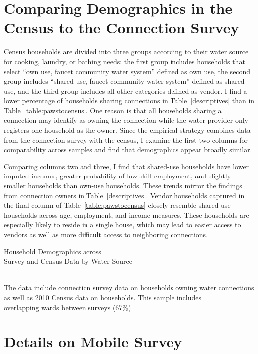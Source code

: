 \documentclass[12pt]{article}
\begin{document}
\begin{appendices}
\section{Comparing Demographics in the Census to the Connection Survey}\label{appendix:pawstocensus}

Census households are divided into three groups according to their water source for cooking, laundry, or bathing needs: the first group includes households that select ``own use, faucet community water system'' defined as own use, the second group includes ``shared use, faucet community water system'' defined as shared use, and the third group includes all other categories defined as vendor.  I find a lower percentage of households sharing connections in Table~\ref{descriptives} than in Table~\ref{table:pawstocensus}.  One reason is that all households sharing a connection may identify as owning the connection while the water provider only registers one household as the owner.  Since the empirical strategy combines data from the connection survey with the census, I examine the first two columns for comparability across samples and find that demographics appear broadly similar.

Comparing columns two and three, I find that shared-use households have lower imputed incomes, greater probability of low-skill employment, and slightly smaller households than own-use households.  These trends mirror the findings from connection owners in Table~\ref{descriptives}.  Vendor households captured in the final column of Table~\ref{table:pawstocensus} closely resemble shared-use households across age, employment, and income measures.  These households are especially likely to reside in a single house, which may lead to easier access to vendors as well as more difficult access to neighboring connections.

\begin{table}
\centering
\caption{Household Demographics across \\ Survey and Census Data by Water Source}\label{table:pawstocensus}
 \\
\footnotesize{The data include connection survey data on households owning water connections \\ as well as 2010 Census data on households. This sample includes \\ overlapping wards between  surveys (67\%)}
\end{table}


\section{Details on Mobile Survey}\label{appendix:pollfish}


\end{appendices}
\end{document}
